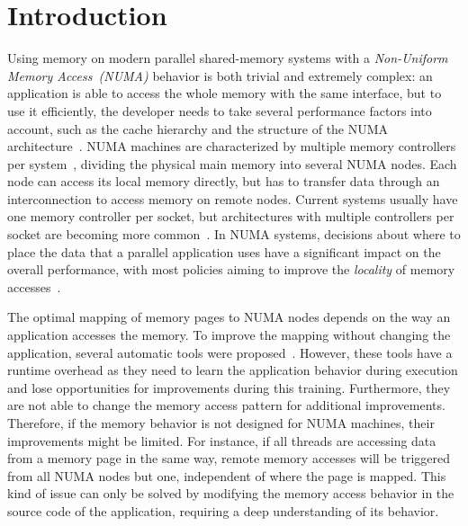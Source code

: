 
\section{Introduction}
\label{sec:intro}

Using memory on modern parallel shared-memory systems with a \emph{Non-Uniform Memory Access~(NUMA)} behavior is both trivial and extremely complex: an application is able to access the whole memory with the same interface, but to use it efficiently, the developer needs to take several performance factors into account, such as the cache hierarchy and the structure of the NUMA architecture~\cite{Drepper07What}.
NUMA machines are characterized by multiple memory controllers per system~\cite{Awasthi2010}, dividing the physical main memory into several NUMA nodes.
Each node can access its local memory directly, but has to transfer data through an interconnection to access memory on remote nodes.
Current systems usually have one memory controller per socket, but architectures with multiple controllers per socket are becoming more common~\cite{AMD2012}.
In NUMA systems, decisions about where to place the data that a parallel application uses have a significant impact on the overall performance, with most policies aiming to improve the \emph{locality} of memory accesses~\cite{Diener2015}.

The optimal mapping of memory pages to NUMA nodes depends on the way an application accesses the memory.
To improve the mapping without changing the application, several automatic tools were proposed~\cite{Corbet2012,Corbet,Dashti2013,Diener2014,Piccoli2014}.
However, these tools have a runtime overhead as they need to learn the application behavior during execution and lose opportunities for improvements during this training.
Furthermore, they are not able to change the memory access pattern for additional improvements.
Therefore, if the memory behavior is not designed for NUMA machines, their improvements might be limited.
For instance, if all threads are accessing data from a memory
page in the same way, remote memory accesses will be triggered from all NUMA nodes but one, independent of where the page is mapped.
This kind of issue can only be solved by modifying the memory access behavior in the source code of the application, requiring a deep understanding of its behavior.

